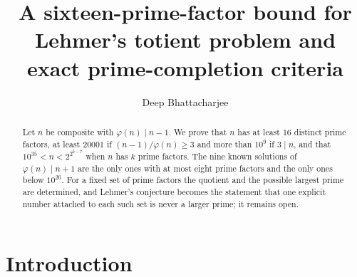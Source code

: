 \documentclass[11pt,reqno]{amsart}
\title[Lehmer's totient problem and exact completions]{A sixteen-prime-factor bound for Lehmer's totient problem and exact prime-completion criteria}
\author{Deep Bhattacharjee}
\date{}
\numberwithin{equation}{section}
\theoremstyle{plain}
\theoremstyle{definition}
\theoremstyle{remark}
\begin{document}
\begin{abstract}
Let $n$ be composite with $\varphi(n)\mid n-1$. We prove that $n$ has
at least $16$ distinct prime factors, at least $20001$ if
$(n-1)/\varphi(n)\ge3$ and more than $10^9$ if $3\mid n$, and that
$10^{35}<n<2^{2^{k-7}}$ when $n$ has $k$ prime factors. The nine
known solutions of $\varphi(n)\mid n+1$ are the only ones with at most
eight prime factors and the only ones below $10^{26}$. For a fixed set
of prime factors the quotient and the possible largest prime are
determined, and Lehmer's conjecture becomes the statement that one
explicit number attached to each such set is never a larger prime; it
remains open.
\end{abstract}

\maketitle

\section{Introduction}\label{sec:intro}
\end{document}
